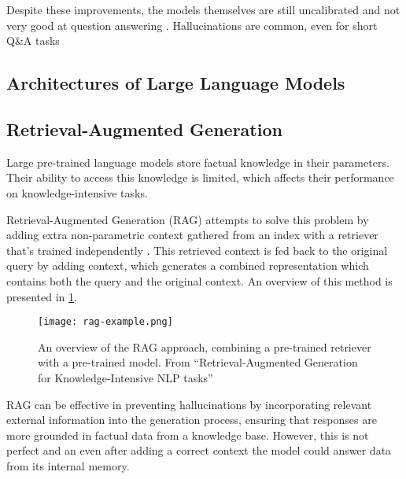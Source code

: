 Despite these improvements, the models themselves are still uncalibrated and not very good at question answering \citep{how_can_we_know}.
Hallucinations are common, even for short Q\&A tasks

\subsection{Architectures of Large Language Models}
\label{llm_architectures}

\subsection{Retrieval-Augmented Generation}

Large pre-trained language models store factual knowledge in their parameters.
Their ability to access this knowledge is limited, which affects their performance on knowledge-intensive tasks.

Retrieval-Augmented Generation (RAG) attempts to solve this problem by adding extra non-parametric context gathered from an index with a retriever that's trained independently \citep{rag}.
This retrieved context is fed back to the original query by adding context, which generates a combined representation which contains both the query and the original context.
An overview of this method is presented in \cref{rag_overview}.

\begin{figure}[htp]
	\centering
	\texttt{[image: rag-example.png]}
	\caption{An overview of the RAG approach, combining a pre-trained retriever with a pre-trained model. From ``Retrieval-Augmented Generation for Knowledge-Intensive NLP tasks'' \citep{rag}}
	\label{rag_overview}
\end{figure}

RAG can be effective in preventing hallucinations by incorporating relevant external information into the generation process, ensuring that responses are more grounded in factual data from a knowledge base.
However, this is not perfect and an even after adding a correct context the model could answer data from its internal memory.



